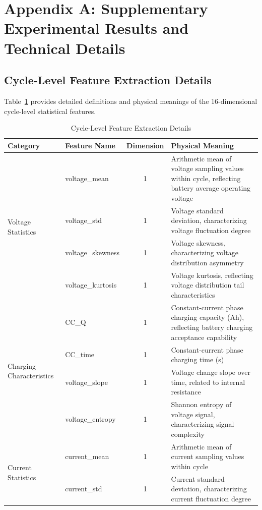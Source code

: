 \documentclass[10pt,a4paper]{article}
\begin{document}
\appendix
\section{Appendix A: Supplementary Experimental Results and Technical Details}

\subsection{Cycle-Level Feature Extraction Details}

Table~\ref{tab:features} provides detailed definitions and physical meanings of the 16-dimensional cycle-level statistical features.

\begin{table}[H]
\centering
\caption{Cycle-Level Feature Extraction Details}
\label{tab:features}
\begin{tabular}{@{}llcp{6cm}@{}}
\toprule
\textbf{Category} & \textbf{Feature Name} & \textbf{Dimension} & \textbf{Physical Meaning} \\
\midrule
\multirow{4}{*}{Voltage Statistics} 
& voltage\_mean & 1 & Arithmetic mean of voltage sampling values within cycle, reflecting battery average operating voltage \\
& voltage\_std & 1 & Voltage standard deviation, characterizing voltage fluctuation degree \\
& voltage\_skewness & 1 & Voltage skewness, characterizing voltage distribution asymmetry \\
& voltage\_kurtosis & 1 & Voltage kurtosis, reflecting voltage distribution tail characteristics \\
\midrule
\multirow{4}{*}{Charging Characteristics} 
& CC\_Q & 1 & Constant-current phase charging capacity (Ah), reflecting battery charging acceptance capability \\
& CC\_time & 1 & Constant-current phase charging time (s) \\
& voltage\_slope & 1 & Voltage change slope over time, related to internal resistance \\
& voltage\_entropy & 1 & Shannon entropy of voltage signal, characterizing signal complexity \\
\midrule
\multirow{8}{*}{Current Statistics} 
& current\_mean & 1 & Arithmetic mean of current sampling values within cycle \\
& current\_std & 1 & Current standard deviation, characterizing current fluctuation degree \\

\end{tabular}
\end{table}
\end{document}
